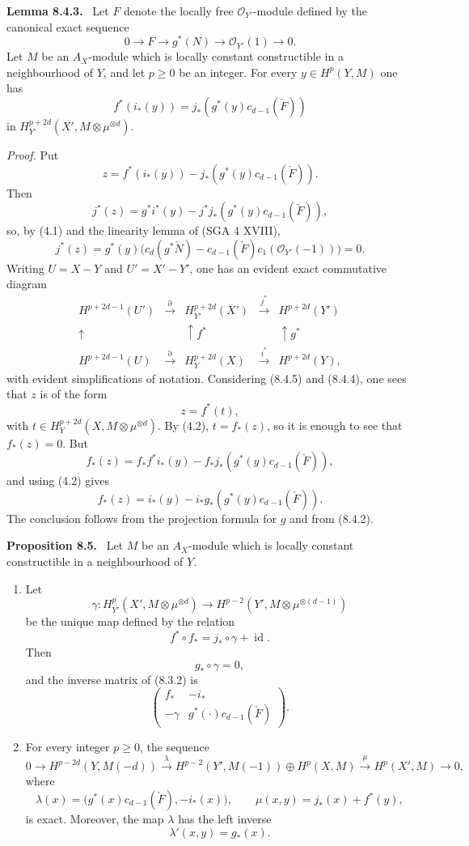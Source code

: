 \documentclass[11pt]{article}
\newenvironment{statement}[1]{\par\medskip\noindent\textbf{#1.}\ }{\par\medskip}
\begin{document}
\begin{statement}{Lemma 8.4.3}
Let $F$ denote the locally free $\mathcal O_{Y'}$-module defined by the canonical exact sequence
\[
0\to F\to g^*(N)\to\mathcal O_{Y'}(1)\to0.
\]
Let $M$ be an $A_X$-module which is locally constant constructible in a neighbourhood of $Y$, and let $p\ge0$ be an integer. For every $y\in H^p(Y,M)$ one has
\[
f^*(i_*(y))=j_*(g^*(y)c_{d-1}(\check F))
\]
in $H_{Y'}^{p+2d}(X',M\otimes\mu^{\otimes d})$.
\end{statement}

\emph{Proof.} Put
\[
z=f^*(i_*(y))-j_*(g^*(y)c_{d-1}(\check F)).
\]
Then
\[
j^*(z)=g^*i^*(y)-j^*j_*(g^*(y)c_{d-1}(\check F)),
\]
so, by (4.1) and the linearity lemma of (SGA 4 XVIII),
\[
j^*(z)=g^*(y)\bigl(c_d(g^*\check N)-c_{d-1}(\check F)c_1(\mathcal O_{Y'}(-1))\bigr)=0.
\tag{8.4.4}
\]
Writing $U=X-Y$ and $U'=X'-Y'$, one has an evident exact commutative diagram
\[
\begin{array}{ccccc}
H^{p+2d-1}(U')&\xrightarrow{\partial}&H^{p+2d}_{Y'}(X')&\xrightarrow{j^*}&H^{p+2d}(Y')\\
\uparrow&&\uparrow f^*&&\uparrow g^*\\
H^{p+2d-1}(U)&\xrightarrow{\partial}&H_Y^{p+2d}(X)&\xrightarrow{i^*}&H^{p+2d}(Y),
\end{array}
\tag{8.4.5}
\]
with evident simplifications of notation. Considering (8.4.5) and (8.4.4), one sees that $z$ is of the form
\[
z=f^*(t),
\]
with $t\in H_Y^{p+2d}(X,M\otimes\mu^{\otimes d})$. By (4.2), $t=f_*(z)$, so it is enough to see that $f_*(z)=0$. But
\[
f_*(z)=f_*f^*i_*(y)-f_*j_*(g^*(y)c_{d-1}(\check F)),
\]
and using (4.2) gives
\[
f_*(z)=i_*(y)-i_*g_*(g^*(y)c_{d-1}(\check F)).
\]
The conclusion follows from the projection formula for $g$ and from (8.4.2).

\begin{statement}{Proposition 8.5}
Let $M$ be an $A_X$-module which is locally constant constructible in a neighbourhood of $Y$.
\begin{enumerate}[label=\alph*)]
\item Let
\[
\gamma:H_{Y'}^p(X',M\otimes\mu^{\otimes d})\to
H^{p-2}(Y',M\otimes\mu^{\otimes(d-1)})
\]
be the unique map defined by the relation
\[
f^*\circ f_* = j_*\circ\gamma+\operatorname{id}.
\tag{8.5.1}
\]
Then
\[
g_*\circ\gamma=0,
\tag{8.5.2}
\]
and the inverse matrix of (8.3.2) is
\[
\begin{pmatrix}
f_*&-i_*\\
-\gamma&g^*(\cdot)c_{d-1}(\check F)
\end{pmatrix}.
\tag{8.5.3}
\]
\item For every integer $p\ge0$, the sequence
\[
0\to H^{p-2d}(Y,M(-d))
\xrightarrow{\lambda}
H^{p-2}(Y',M(-1))\oplus H^p(X,M)
\xrightarrow{\mu}
H^p(X',M)\to0,
\]
where
\[
\lambda(x)=\bigl(g^*(x)c_{d-1}(\check F),-i_*(x)\bigr),
\qquad
\mu(x,y)=j_*(x)+f^*(y),
\]
is exact. Moreover, the map $\lambda$ has the left inverse
\[
\lambda'(x,y)=g_*(x).
\]
\end{enumerate}
\end{statement}
\end{document}
